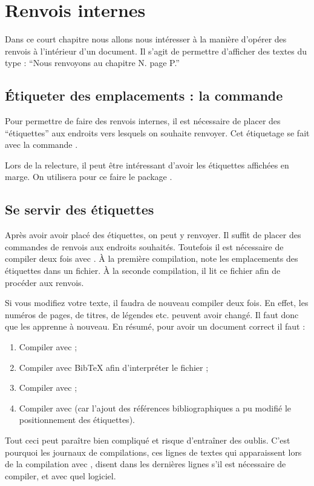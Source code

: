 \chapter{Renvois internes}\label{label}

\begin{prealable}
Dans ce court chapitre nous allons nous intéresser à la manière d'opérer des renvois à l'intérieur d'un document.
Il s'agit de permettre d'afficher des textes du type : \enquote{Nous renvoyons au chapitre N. page P.}
\end{prealable}

\section{Étiqueter des  emplacements : la commande }

Pour permettre de faire des renvois internes, il est nécessaire de placer des \enquote{étiquettes} aux endroits vers lesquels on souhaite renvoyer.
Cet étiquetage  se fait avec la commande .

\begin{anedocte}
Lors de la relecture, il peut être intéressant d'avoir les étiquettes affichées en marge. On utilisera pour ce faire le package .
\end{anedocte}

\section{Se servir des étiquettes}

Après avoir avoir placé des étiquettes, on peut y renvoyer. 
Il suffit de placer des commandes de renvois aux endroits souhaités. 
Toutefois il est nécessaire de compiler deux fois avec \XeLaTeX{}.
À la première compilation,   \XeLaTeX{}%
note les emplacements des étiquettes dans un fichier. À la seconde compilation, il lit ce fichier afin de procéder aux renvois. 

\begin{attention}
	Si vous modifiez votre texte, il faudra de nouveau compiler deux fois. En effet, les numéros de pages, de titres, de légendes etc. peuvent avoir changé. Il faut donc  que \XeLaTeX{} les apprenne à nouveau. En résumé, pour avoir un document correct il faut :
	\begin{enumerate}
		\item Compiler avec \XeLaTeX{};
		\item Compiler avec BibTeX afin d'interpréter le fichier ;
		\item Compiler avec \XeLaTeX{};
		\item Compiler avec \XeLaTeX{} (car l'ajout des références bibliographiques a pu modifié le positionnement des étiquettes).
	\end{enumerate}
	
	Tout ceci peut paraître bien compliqué et risque d'entraîner des oublis. C'est pourquoi les journaux de compilations, ces lignes de textes qui apparaissent lors de la compilation avec \XeLaTeX{}, disent dans les dernières lignes s'il est nécessaire de compiler, et avec quel logiciel.
\end{attention}

